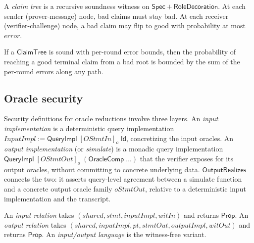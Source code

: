 \begin{definition}
  \label{int:claim-tree}
  A \emph{claim tree} is a recursive soundness witness on $\mathsf{Spec} +
  \mathsf{RoleDecoration}$.  At each sender (prover-message) node, bad claims
  must stay bad.  At each receiver (verifier-challenge) node, a bad claim may
  flip to good with probability at most $\mathit{error}$.
\end{definition}

\begin{theorem}
  \label{thm:bound-terminal-prob}
  If a $\mathsf{ClaimTree}$ is sound with per-round error bounds, then the
  probability of reaching a good terminal claim from a bad root is bounded by
  the sum of the per-round errors along any path.
\end{theorem}

\subsection{Oracle security}\label{subsec:oracle-security}

Security definitions for oracle reductions involve three layers.
An \emph{input implementation} is a deterministic query implementation
$\mathit{InputImpl} := \mathsf{QueryImpl}\;[\mathit{OStmtIn}]_o\;\mathsf{Id}$,
concretizing the input oracles.
An \emph{output implementation} (or \emph{simulate}) is a monadic query
implementation $\mathsf{QueryImpl}\;[\mathit{OStmtOut}]_o\;(\mathsf{OracleComp}\;\ldots)$
that the verifier exposes for its output oracles, without committing to
concrete underlying data.
$\mathsf{OutputRealizes}$ connects the two: it asserts query-level agreement
between a simulate function and a concrete output oracle family
$\mathit{oStmtOut}$, relative to a deterministic input implementation
and the transcript.

\begin{definition}
  \label{int:oracle-relation}
  An \emph{input relation} takes $(\mathit{shared}, \mathit{stmt},
  \mathit{inputImpl}, \mathit{witIn})$ and returns $\mathsf{Prop}$.
  An \emph{output relation} takes $(\mathit{shared}, \mathit{inputImpl},
  \mathit{pt}, \mathit{stmtOut}, \mathit{outputImpl}, \mathit{witOut})$
  and returns $\mathsf{Prop}$.
  An \emph{input/output language} is the witness-free variant.
\end{definition}

